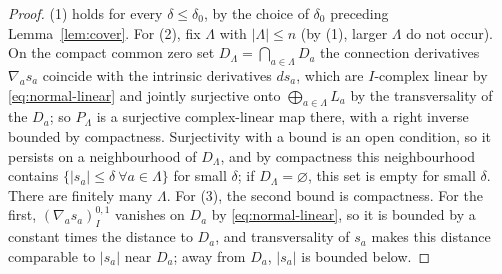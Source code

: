 \documentclass[11pt]{article}
\theoremstyle{remark}
\begin{document}
\begin{proof}
(1) holds for every $\delta\le\delta_0$, by the choice of $\delta_0$
preceding Lemma~\ref{lem:cover}. For (2), fix
$\Lambda$ with $|\Lambda|\le n$ (by (1), larger $\Lambda$ do not occur).
On the compact common zero set $D_\Lambda=\bigcap_{a\in\Lambda}D_a$ the
connection derivatives $\nabla_as_a$ coincide with the intrinsic
derivatives $ds_a$, which are $I$-complex linear by
\eqref{eq:normal-linear} and jointly surjective onto
$\bigoplus_{a\in\Lambda}L_a$ by the transversality of the $D_a$; so
$P_\Lambda$ is a surjective complex-linear map there, with a right
inverse bounded by compactness. Surjectivity with a bound is an open
condition, so it persists on a neighbourhood of $D_\Lambda$, and by
compactness this neighbourhood contains
$\{|s_a|\le\delta\ \forall a\in\Lambda\}$ for small $\delta$; if
$D_\Lambda=\varnothing$, this set is empty for small $\delta$. There are
finitely many $\Lambda$. For (3), the second bound is compactness.
For the first, $(\nabla_as_a)^{0,1}_I$ vanishes on $D_a$ by
\eqref{eq:normal-linear}, so it is bounded by a constant times the
distance to $D_a$, and transversality of $s_a$ makes this distance
comparable to $|s_a|$ near $D_a$; away from $D_a$, $|s_a|$ is bounded
below.
\end{proof}
\end{document}
